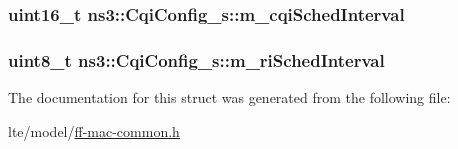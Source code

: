 \subsubsection[{\texorpdfstring{m\+\_\+cqi\+Sched\+Interval}{m_cqiSchedInterval}}]{\setlength{\rightskip}{0pt plus 5cm}uint16\+\_\+t ns3\+::\+Cqi\+Config\+\_\+s\+::m\+\_\+cqi\+Sched\+Interval}\hypertarget{structns3_1_1CqiConfig__s_ac66d6b349497fddbda64354a7c648e33}{}\label{structns3_1_1CqiConfig__s_ac66d6b349497fddbda64354a7c648e33}
\subsubsection[{\texorpdfstring{m\+\_\+ri\+Sched\+Interval}{m_riSchedInterval}}]{\setlength{\rightskip}{0pt plus 5cm}uint8\+\_\+t ns3\+::\+Cqi\+Config\+\_\+s\+::m\+\_\+ri\+Sched\+Interval}\hypertarget{structns3_1_1CqiConfig__s_a4c055f0c3423d2684c05684110ddc38e}{}\label{structns3_1_1CqiConfig__s_a4c055f0c3423d2684c05684110ddc38e}


The documentation for this struct was generated from the following file\+:\begin{DoxyCompactItemize}
\item 
lte/model/\hyperlink{ff-mac-common_8h}{ff-\/mac-\/common.\+h}\end{DoxyCompactItemize}
